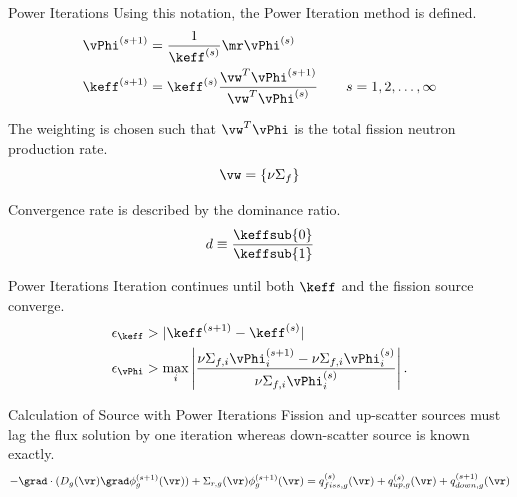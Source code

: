 \begin{frame}{Power Iterations}
  Using this notation, the Power Iteration method is defined.
  \begin{align}
    \label{eq:power_iteration_phi}
    \vPhi^{(s+1)} &= \frac{1}{\keff^{(s)}} \mr \vPhi^{(s)} \\
    \label{eq:power_iteration_eigenvalue}
    \keff^{(s+1)} &= \keff^{(s)} \frac{\vw^{T} \vPhi^{(s+1)}}
      {\vw^{T} \vPhi^{(s)}} \qquad s = 1,2,\ldots,\infty
  \end{align}

  The weighting is chosen such that $\vw^{T} \vPhi$ is the total fission neutron
  production rate.
  \begin{equation}
    \vw = \{\nu \Sigma_f \}
  \end{equation}

  Convergence rate is described by the dominance ratio.
  \begin{equation}
    d \equiv \frac{\keffsub{0}}{\keffsub{1}}
  \end{equation}
\end{frame}

\begin{frame}{Power Iterations}
  Iteration continues until both $\keff$ and the fission source converge.
  \begin{align}
    \label{eq:eigenvalue_tol}
    \epsilon_{\keff} &> | \keff^{(s+1)} - \keff^{(s)} | \\
    \label{eq:eigenvector_tol}
    \epsilon_{\vPhi} &> \max_i \left| \frac{\nu\Sigma_{f,i}\vPhi_i^{(s+1)} - 
      \nu\Sigma_{f,i} \vPhi_i^{(s)}}
      {\nu\Sigma_{f,i} \vPhi_i^{(s)}}\right| .
  \end{align}
\end{frame}

\begin{frame}{Calculation of Source with Power Iterations}
  Fission and up-scatter sources must lag the flux solution by one iteration
  whereas down-scatter source is known exactly.
  \begin{equation} 
    \label{eq:multigroup_power_iterations}
    -\grad \cdot (D_g(\vr) \grad \phi_g^{(s+1)}(\vr)) + \Sigma_{r,g}(\vr)
    \phi_g^{(s+1)}(\vr) = q_{fiss,g}^{(s)}(\vr) + q_{up,g}^{(s)}(\vr) +
    q_{down,g}^{(s+1)}(\vr)
  \end{equation}
\end{frame}

